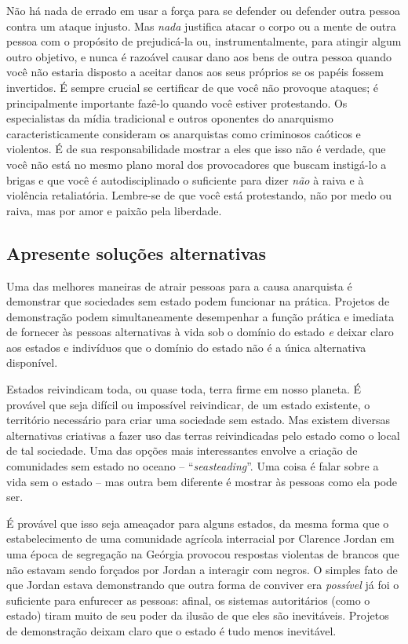 Não há nada de errado em usar a força para se defender ou defender outra pessoa contra um ataque injusto. Mas \emph{nada} justifica atacar o corpo ou a mente de outra pessoa com o propósito de prejudicá-la ou, instrumentalmente, para atingir algum outro objetivo, e nunca é razoável causar dano aos bens de outra pessoa quando você não estaria disposto a aceitar danos aos seus próprios se os papéis fossem invertidos. É sempre crucial se certificar de que você não provoque ataques; é principalmente importante fazê-lo quando você estiver protestando. Os especialistas da mídia tradicional e outros oponentes do anarquismo caracteristicamente consideram os anarquistas como criminosos caóticos e violentos. É de sua responsabilidade mostrar a eles que isso não é verdade, que você não está no mesmo plano moral dos provocadores que buscam instigá-lo a brigas e que você é autodisciplinado o suficiente para dizer \emph{não} à raiva e à violência retaliatória. Lembre-se de que você está protestando, não por medo ou raiva, mas por amor e paixão pela liberdade.

\subsection*{Apresente soluções alternativas}

Uma das melhores maneiras de atrair pessoas para a causa anarquista é demonstrar que sociedades sem estado podem funcionar na prática. Projetos de demonstração podem simultaneamente desempenhar a função prática e imediata de fornecer às pessoas alternativas à vida sob o domínio do estado \emph{e} deixar claro aos estados e indivíduos que o domínio do estado não é a única alternativa disponível.

Estados reivindicam toda, ou quase toda, terra firme em nosso planeta. É provável que seja difícil ou impossível reivindicar, de um estado existente, o território necessário para criar uma sociedade sem estado. Mas existem diversas alternativas criativas a fazer uso das terras reivindicadas pelo estado como o local de tal sociedade. Uma das opções mais interessantes envolve a criação de comunidades sem estado no oceano -- ``\emph{seasteading}''. Uma coisa é falar sobre a vida sem o estado -- mas outra bem diferente é mostrar às pessoas como ela pode ser.

É provável que isso seja ameaçador para alguns estados, da mesma forma que o estabelecimento de uma comunidade agrícola interracial por Clarence Jordan em uma época de segregação na Geórgia provocou respostas violentas de brancos que não estavam sendo forçados por Jordan a interagir com negros. O simples fato de que Jordan estava demonstrando que outra forma de conviver era \emph{possível} já foi o suficiente para enfurecer as pessoas: afinal, os sistemas autoritários (como o estado) tiram muito de seu poder da ilusão de que eles são inevitáveis. Projetos de demonstração deixam claro que o estado é tudo menos inevitável.

